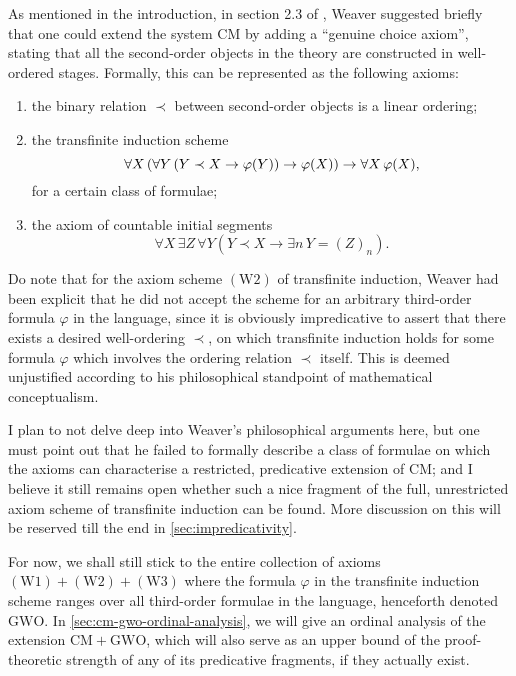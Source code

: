 \documentclass[11pt]{article}
\theoremstyle{plain}
\theoremstyle{definition}
\begin{document}
As mentioned in the introduction, in section 2.3 of \cite{weaver09-cm}, Weaver suggested briefly that one could extend the system $\mathrm{CM}$ by adding a ``genuine choice axiom'', stating that all the second-order objects in the theory are constructed in well-ordered stages. Formally, this can be represented as the following axioms:
\begin{enumerate}[label=$\left(\mathrm{W}\arabic*\right)$]
    \item the binary relation $\prec$ between second-order objects is a linear ordering;
    \item the transfinite induction scheme
          \[\forall X \left(\forall Y \left(Y \prec X \rightarrow \varphi\mleft(Y\mright)\right) \rightarrow \varphi\mleft(X\mright)\right) \rightarrow \forall X \, \varphi\mleft(X\mright),\]
          for a certain class of formulae;
    \item the axiom of countable initial segments
          \[\forall X \, \exists Z \, \forall Y \left(Y \prec X \rightarrow \exists n \, Y = \left(Z\right)_n\right).\]
\end{enumerate}

Do note that for the axiom scheme $\left(\mathrm{W}2\right)$ of transfinite induction, Weaver had been explicit that he did not accept the scheme for an arbitrary third-order formula $\varphi$ in the language, since it is obviously impredicative to assert that there exists a desired well-ordering $\prec$, on which transfinite induction holds for some formula $\varphi$ which involves the ordering relation $\prec$ itself. This is deemed unjustified according to his philosophical standpoint of mathematical conceptualism.

I plan to not delve deep into Weaver's philosophical arguments here, but one must point out that he failed to formally describe a class of formulae on which the axioms can characterise a restricted, predicative extension of $\mathrm{CM}$; and I believe it still remains open whether such a nice fragment of the full, unrestricted axiom scheme of transfinite induction can be found. More discussion on this will be reserved till the end in \autoref{sec:impredicativity}.

For now, we shall still stick to the entire collection of axioms $\left(\mathrm{W}1\right) + \left(\mathrm{W}2\right) + \left(\mathrm{W}3\right)$ where the formula $\varphi$ in the transfinite induction scheme ranges over all third-order formulae in the language, henceforth denoted $\mathrm{GWO}$. In \autoref{sec:cm-gwo-ordinal-analysis}, we will give an ordinal analysis of the extension $\mathrm{CM} + \mathrm{GWO}$, which will also serve as an upper bound of the proof-theoretic strength of any of its predicative fragments, if they actually exist.
\end{document}
